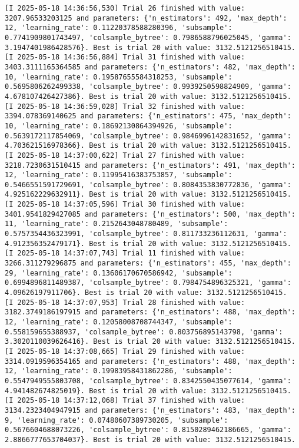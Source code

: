 \documentclass[
  letterpaper,
  DIV=11,
  numbers=noendperiod]{scrreprt}
\begin{document}
\begin{verbatim}
[I 2025-05-18 14:36:56,530] Trial 26 finished with value: 3207.96533203125 and parameters: {'n_estimators': 492, 'max_depth': 12, 'learning_rate': 0.11220378588280396, 'subsample': 0.7741909801743497, 'colsample_bytree': 0.7986588796025045, 'gamma': 3.1947401986428576}. Best is trial 20 with value: 3132.5121256510415.
[I 2025-05-18 14:36:56,884] Trial 31 finished with value: 3403.3111165364585 and parameters: {'n_estimators': 482, 'max_depth': 10, 'learning_rate': 0.19587655584318253, 'subsample': 0.5695806262499338, 'colsample_bytree': 0.9939250598824909, 'gamma': 4.678107426427386}. Best is trial 20 with value: 3132.5121256510415.
[I 2025-05-18 14:36:59,028] Trial 32 finished with value: 3394.078369140625 and parameters: {'n_estimators': 475, 'max_depth': 10, 'learning_rate': 0.18692130864394926, 'subsample': 0.5639172117854069, 'colsample_bytree': 0.9846996142831652, 'gamma': 4.703621516978366}. Best is trial 20 with value: 3132.5121256510415.
[I 2025-05-18 14:37:00,622] Trial 27 finished with value: 3218.7230631510415 and parameters: {'n_estimators': 491, 'max_depth': 12, 'learning_rate': 0.11995416383753857, 'subsample': 0.5466551591729691, 'colsample_bytree': 0.8084353830772836, 'gamma': 4.925162229632911}. Best is trial 20 with value: 3132.5121256510415.
[I 2025-05-18 14:37:05,596] Trial 30 finished with value: 3401.9541829427085 and parameters: {'n_estimators': 500, 'max_depth': 11, 'learning_rate': 0.2152643048780489, 'subsample': 0.5757354436323991, 'colsample_bytree': 0.811733236112631, 'gamma': 4.912356352479171}. Best is trial 20 with value: 3132.5121256510415.
[I 2025-05-18 14:37:07,743] Trial 11 finished with value: 3266.311279296875 and parameters: {'n_estimators': 455, 'max_depth': 29, 'learning_rate': 0.13606170670586942, 'subsample': 0.6994896811489387, 'colsample_bytree': 0.7984754896325321, 'gamma': 4.09626197911706}. Best is trial 20 with value: 3132.5121256510415.
[I 2025-05-18 14:37:07,953] Trial 28 finished with value: 3182.3749186197915 and parameters: {'n_estimators': 488, 'max_depth': 12, 'learning_rate': 0.12058008708744347, 'subsample': 0.558159655388937, 'colsample_bytree': 0.803756895143798, 'gamma': 3.3020110039626416}. Best is trial 20 with value: 3132.5121256510415.
[I 2025-05-18 14:37:08,665] Trial 29 finished with value: 3314.0919596354165 and parameters: {'n_estimators': 488, 'max_depth': 12, 'learning_rate': 0.19983958431862286, 'subsample': 0.5547949555803708, 'colsample_bytree': 0.8342550435077614, 'gamma': 4.941482674825019}. Best is trial 20 with value: 3132.5121256510415.
[I 2025-05-18 14:37:12,068] Trial 37 finished with value: 3134.2323404947915 and parameters: {'n_estimators': 483, 'max_depth': 9, 'learning_rate': 0.07480607389730205, 'subsample': 0.5676604688073226, 'colsample_bytree': 0.8150289462186665, 'gamma': 2.8866777653704037}. Best is trial 20 with value: 3132.5121256510415.

\end{verbatim}
\end{document}
